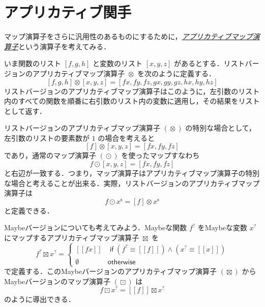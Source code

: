 \documentclass[a4paper,draft]{jsbook}
\def\[{\left[\!\left[}
\def\]{\right]\!\right]}
\newcommand{\keyword}[1]{{\underline{\emph{#1}}}}
\newcommand{\mNothing}{\emptyset}
\newcommand{\mKeyword}[1]{\mathsf{#1}}
\newcommand{\mIfKeyword}{\mKeyword{if}}
\newcommand{\mOtherwiseKeyword}{\mKeyword{otherwise}}
\newcommand{\mListWith}[1]{\left[#1\right]}
\newcommand{\mMaybeWith}[1]{\[#1\]}
\newcommand{\mList}[1]{{#1}^\mathrm{s}}
\newcommand{\mMaybe}[1]{{#1}^\text{?}}
\DeclareMathOperator{\mMapList}{\odot}
\DeclareMathOperator{\mMapMaybe}{\boxdot}
\DeclareMathOperator{\mApplicativeMapList}{\otimes}
\DeclareMathOperator{\mApplicativeMapMaybe}{\boxtimes}
\DeclareMathOperator{\mLogicalAnd}{\wedge}
\DeclareMathOperator{\mIf}{\mIfKeyword}
\DeclareMathOperator{\mOtherwise}{\mOtherwiseKeyword}
\begin{document}
\section{アプリカティブ関手}

マップ演算子をさらに汎用性のあるものにするために，\keyword{アプリカティブマップ演算子}という演算子を考えてみる．

いま関数のリスト $\mListWith{f,g,h}$ と変数のリスト $\mListWith{x,y,z}$ があるとする．リストバージョンのアプリカティブマップ演算子 $\mApplicativeMapList$ を次のように定義する．
\begin{equation}
\mListWith{f,g,h}\mApplicativeMapList\mListWith{x,y,z}
=\mListWith{fx,fy,fz,gx,gy,gz,hx,hy,hz}
\end{equation}
リストバージョンのアプリカティブマップ演算子はこのように，左引数のリスト内のすべての関数を順番に右引数のリスト内の変数に適用し，その結果をリストとして返す．

リストバージョンのアプリカティブマップ演算子 $(\mApplicativeMapList)$ の特別な場合として，左引数のリストの要素数が $1$ の場合を考えると
\begin{equation}
\mListWith{f}\mApplicativeMapList\mListWith{x,y,z}
=\mListWith{fx,fy,fz}
\end{equation}
であり，通常のマップ演算子 $(\mMapList)$ を使ったマップすなわち
\begin{equation}
f\mMapList\mListWith{x,y,z}
=\mListWith{fx,fy,fz}
\end{equation}
と右辺が一致する．つまり，マップ演算子はアプリカティブマップ演算子の特別な場合と考えることが出来る．実際，リストバージョンのアプリカティブマップ演算子は
\begin{equation}
f\mMapList\mList{x}
=\mListWith{f}\mApplicativeMapList\mList{x}
\end{equation}
と定義できる．

Maybeバージョンについても考えてみよう．Maybeな関数 $\mMaybe{f}$ をMaybeな変数 $\mMaybe{x}$ にマップするアプリカティブマップ演算子 $\mApplicativeMapMaybe$ を
\begin{equation}
\mMaybe{f}\mApplicativeMapMaybe\mMaybe{x}
=\left\{
\begin{array}{ll}
\mMaybeWith{fx}
&\mIf\left(\mMaybe{f}\equiv\mMaybeWith{f}\right)
\mLogicalAnd
\left(\mMaybe{x}\equiv\mMaybeWith{x}\right)\\
\mNothing&\mOtherwise
\end{array}
\right.
\end{equation}
で定義する．このMaybeバージョンのアプリカティブマップ演算子 $(\mApplicativeMapMaybe)$ からMaybeバージョンのマップ演算子 $(\mMapMaybe)$ は
\begin{equation}
f\mMapMaybe\mMaybe{x}
=\mMaybeWith{f}\mApplicativeMapMaybe\mMaybe{x}
\end{equation}
のように導出できる．
\end{document}
